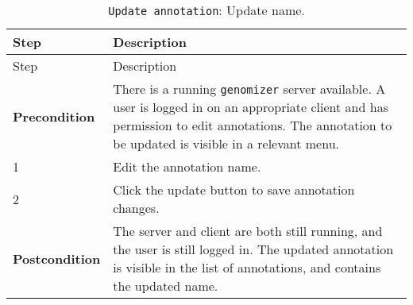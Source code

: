 \begin{longtable}[c]{@{}ll@{}}
\caption{\texttt{Update\ annotation}: Update name.}\tabularnewline
\toprule
\begin{minipage}[b]{0.31\columnwidth}\raggedright\strut
Step
\strut\end{minipage} &
\begin{minipage}[b]{0.63\columnwidth}\raggedright\strut
Description
\strut\end{minipage}\tabularnewline
\midrule
\endfirsthead
\toprule
\begin{minipage}[b]{0.31\columnwidth}\raggedright\strut
Step
\strut\end{minipage} &
\begin{minipage}[b]{0.63\columnwidth}\raggedright\strut
Description
\strut\end{minipage}\tabularnewline
\midrule
\endhead
\begin{minipage}[t]{0.31\columnwidth}\raggedright\strut
\textbf{Precondition}
\strut\end{minipage} &
\begin{minipage}[t]{0.63\columnwidth}\raggedright\strut
There is a running \texttt{genomizer} server available. A user is logged
in on an appropriate client and has permission to edit annotations. The
annotation to be updated is visible in a relevant menu.
\strut\end{minipage}\tabularnewline
\begin{minipage}[t]{0.31\columnwidth}\raggedright\strut
1
\strut\end{minipage} &
\begin{minipage}[t]{0.63\columnwidth}\raggedright\strut
Edit the annotation name.
\strut\end{minipage}\tabularnewline
\begin{minipage}[t]{0.31\columnwidth}\raggedright\strut
2
\strut\end{minipage} &
\begin{minipage}[t]{0.63\columnwidth}\raggedright\strut
Click the update button to save annotation changes.
\strut\end{minipage}\tabularnewline
\begin{minipage}[t]{0.31\columnwidth}\raggedright\strut
\textbf{Postcondition}
\strut\end{minipage} &
\begin{minipage}[t]{0.63\columnwidth}\raggedright\strut
The server and client are both still running, and the user is still
logged in. The updated annotation is visible in the list of annotations,
and contains the updated name.
\strut\end{minipage}\tabularnewline
\bottomrule
\end{longtable}

